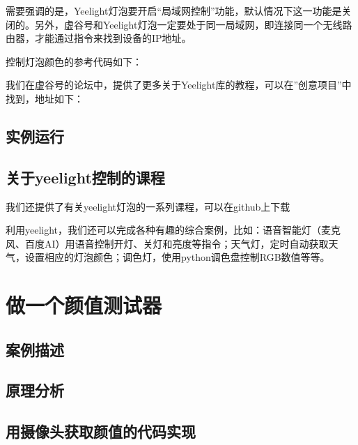 \documentclass[letterpaper,10pt,english]{sphinxmanual}
\begin{document}
需要强调的是，Yeelight灯泡要开启“局域网控制”功能，默认情况下这一功能是关闭的。另外，虚谷号和Yeelight灯泡一定要处于同一局域网，即连接同一个无线路由器，才能通过指令来找到设备的IP地址。

控制灯泡颜色的参考代码如下：

\noindent{}

我们在虚谷号的论坛中，提供了更多关于Yeelight库的教程，可以在”创意项目”中找到，地址如下：


\subsection{实例运行}
\label{\detokenize{09.case/9.1-yeelight:id7}}
\noindent{}


\subsection{关于yeelight控制的课程}
\label{\detokenize{09.case/9.1-yeelight:id8}}
我们还提供了有关yeelight灯泡的一系列课程，可以在github上下载


利用yeelight，我们还可以完成各种有趣的综合案例，比如：语音智能灯（麦克风、百度AI）用语音控制开灯、关灯和亮度等指令；天气灯，定时自动获取天气，设置相应的灯泡颜色；调色灯，使用python调色盘控制RGB数值等等。


\section{做一个颜值测试器}
\label{\detokenize{09.case/9.2-facetest::doc}}\label{\detokenize{09.case/9.2-facetest:id1}}

\subsection{案例描述}
\label{\detokenize{09.case/9.2-facetest:id2}}

\subsection{原理分析}
\label{\detokenize{09.case/9.2-facetest:id3}}

\subsection{用摄像头获取颜值的代码实现}
\label{\detokenize{09.case/9.2-facetest:id4}}


\renewcommand{\indexname}{Index}
\printindex
\end{document}
